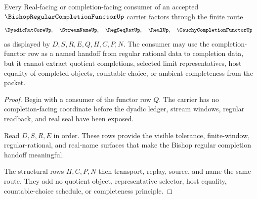 \begin{theorem}
\label{thm:bishop-regular-completion-functor-consumer-boundary}
Every Real-facing or completion-facing consumer of an accepted $\BishopRegularCompletionFunctorUp$ carrier factors through the finite route
$$
\DyadicRatCoreUp,\quad \StreamNameUp,\quad \RegSeqRatUp,\quad \RealUp,\quad \CauchyCompletionFunctorUp
$$
as displayed by $D,S,R,E,Q,H,C,P,N$. The consumer may use the completion-functor row as a named handoff from regular rational data to completion data, but it cannot extract quotient completions, selected limit representatives, host equality of completed objects, countable choice, or ambient completeness from the packet.
\end{theorem}
\begin{proof}
Begin with a consumer of the functor row $Q$. The carrier has no completion-facing coordinate before the dyadic ledger, stream windows, regular readback, and real seal have been exposed.

Read $D,S,R,E$ in order. These rows provide the visible tolerance, finite-window, regular-rational, and real-name surfaces that make the Bishop regular completion handoff meaningful.

The structural rows $H,C,P,N$ then transport, replay, source, and name the same route. They add no quotient object, representative selector, host equality, countable-choice schedule, or completeness principle.
\end{proof}




